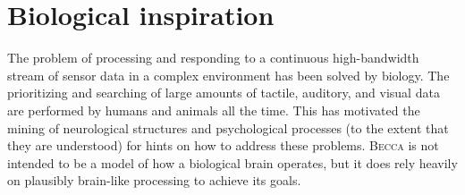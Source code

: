 \chapter{Biological inspiration}
 
The problem of processing and responding to a continuous high-bandwidth stream of sensor data in a complex environment has been solved by biology. The prioritizing and searching of large amounts of tactile, auditory, and visual data are performed by humans and animals all the time. This has motivated the mining of neurological structures and psychological processes (to the extent that they are understood) for hints on how to address these problems. \textsc{Becca} is not intended to be a model of how a biological brain operates, but it does rely heavily on plausibly brain-like processing to achieve its goals.

